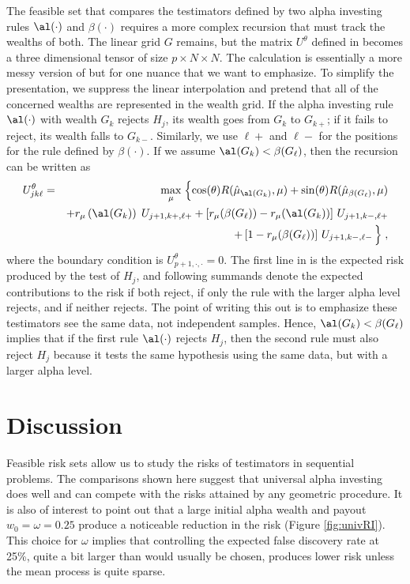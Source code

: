\documentclass[12pt]{article}
\begin{document}
 The feasible set that compares the testimators defined by two alpha investing
 rules $\al(\cdot)$ and $\beta(\cdot)$ requires a more complex recursion that
 must track the wealths of both.  The linear grid $G$ remains, but the matrix
 $U^\theta$ defined in  becomes a three dimensional tensor of size
 $p \times N \times N$.  The calculation is essentially a more messy version of
  but for one nuance that we want to emphasize.  To simplify the
 presentation, we suppress the linear interpolation and pretend that all of the
 concerned wealths are represented in the wealth grid.  If the alpha investing
 rule $\al(\cdot)$ with wealth $G_k$ rejects $H_j$, its wealth goes from $G_k$
 to $G_{k+}$; if it fails to reject, its wealth falls to $G_{k-}$.  Similarly,
 we use $\ell+$ and $\ell-$ for the positions for the rule defined by
 $\beta(\cdot)$.  If we assume $\al(G_k) < \beta(G_\ell)$, then the recursion
 can be written as
 \begin{eqnarray}
   U^\theta_{jk\ell} &=&  \max_\mu \;\Bigl\{
     \cos(\theta) R(\hat\mu_{\al(G_k)}, \mu) 
       + \sin(\theta) R(\hat\mu_{\beta(G_\ell)},\mu) \cr
     & & + r_\mu\left(\al(G_k)\right) \; U_{j+1,k+,\ell+} 
         + \left[ r_\mu(\beta(G_\ell)) - r_\mu(\al(G_k)) \right] \, U_{j+1,k-,\ell+} \cr
     & & + \left[1-r_\mu(\beta(G_\ell))\right] \, U_{j+1,k-,\ell-} \, \Bigr\}\;,
 \label{eq:Ujkl}
 \end{eqnarray}
 where the boundary condition is $U_{p+1,\cdot,\cdot}^\theta= 0$.  The first
 line in  is the expected risk produced by the test of $H_j$, and
 following summands denote the expected contributions to the risk if both
 reject, if only the rule with the larger alpha level rejects, and if neither
 rejects.  The point of writing this out is to emphasize these testimators see
 the same data, not independent samples.  Hence, $\al(G_k) < \beta(G_\ell)$
 implies that if the first rule $\al(\cdot)$ rejects $H_j$, then the second rule
 must also reject $H_j$ because it tests the same hypothesis using the same
 data, but with a larger alpha level.


\section{ Discussion }

 Feasible risk sets allow us to study the risks of testimators in sequential
 problems.  The comparisons shown here suggest that universal alpha investing
 does well and can compete with the risks attained by any geometric procedure.
  It is also of interest to point out that a large initial alpha wealth and
 payout $w_0 = \omega = 0.25$ produce a noticeable reduction in the risk (Figure
 \ref{fig:univRI}).  This choice for $\omega$ implies that controlling the
 expected false discovery rate at 25\%, quite a bit larger than would usually be
 chosen, produces lower risk unless the mean process is quite sparse.
\end{document}
